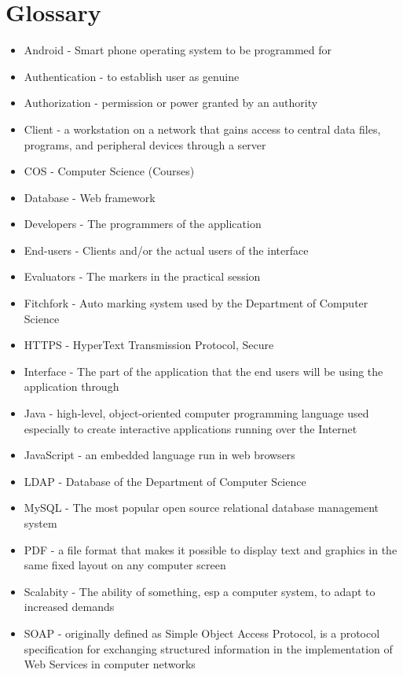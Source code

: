 \section{Glossary}
\begin{itemize}

\item Android - Smart phone operating system to be programmed for
\item Authentication - to establish user as genuine
\item Authorization - permission or power granted by an authority
\item Client - a workstation on a network that gains access to central data files, programs, and peripheral devices through a server
\item COS - Computer Science (Courses)
\item Database - Web framework
\item Developers - The programmers of the application
\item End-users - Clients and/or the actual users of the interface
\item Evaluators - The markers in the practical session
\item Fitchfork - Auto marking system used by the Department of Computer Science
\item HTTPS - HyperText Transmission Protocol, Secure 
\item Interface - The part of the application that the end users will be using the application through
\item Java -  high-level, object-oriented computer programming language used especially to create interactive applications running over the Internet
\item JavaScript - an embedded language run in web browsers
\item LDAP - Database of the Department of Computer Science
\item MySQL - The most popular open source relational database management system
\item PDF - a file format that makes it possible to display text and graphics in the same fixed layout on any computer screen
\item Scalabity - The ability of something, esp a computer system, to adapt to increased demands
\item SOAP - originally defined as Simple Object Access Protocol, is a protocol specification for exchanging structured information in the implementation of Web Services in computer networks


\end{itemize}
